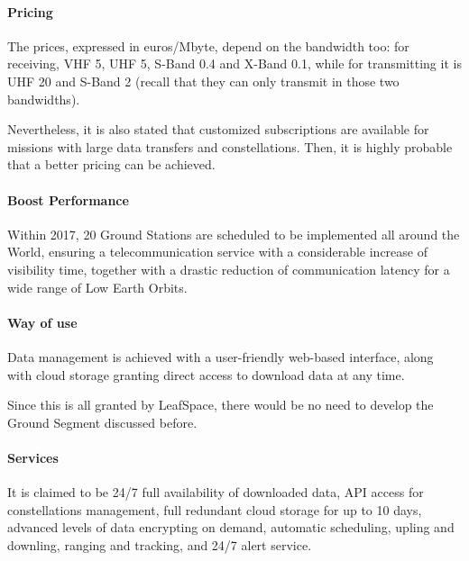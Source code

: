 \paragraph{Pricing}
The prices, expressed in euros/Mbyte, depend on the bandwidth too: for receiving, VHF 5, UHF 5, S-Band 0.4 and X-Band 0.1, while for transmitting it is UHF 20 and S-Band 2 (recall that they can only transmit in those two bandwidths). 

Nevertheless, it is also stated that customized subscriptions are available for missions with large data transfers and constellations. Then, it is highly probable that a better pricing can be achieved. 

\paragraph{Boost Performance}
Within 2017, 20 Ground Stations are scheduled to be implemented all around the World, ensuring a telecommunication service with a considerable increase of visibility time, together with a drastic reduction of communication latency for a wide range of Low Earth Orbits. 

\paragraph{Way of use}
Data management is achieved with a user-friendly web-based interface, along with cloud storage granting direct access to download data at any time. 

Since this is all granted by LeafSpace, there would be no need to develop the Ground Segment discussed before. 

\paragraph{Services}
It is claimed to be 24/7 full availability of downloaded data, API access for constellations management, full redundant cloud storage for up to 10 days, advanced levels of data encrypting on demand, automatic scheduling, upling and downling, ranging and tracking, and 24/7 alert service. 

